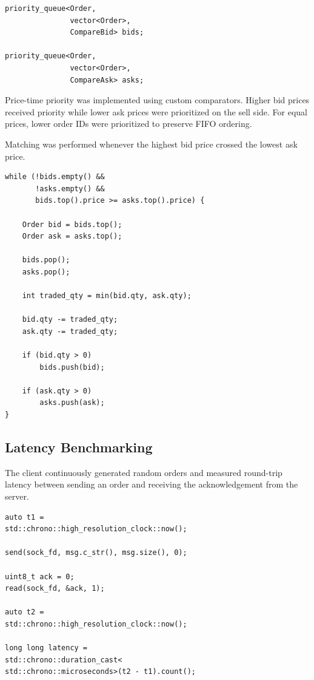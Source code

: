 \documentclass{article}
\begin{document}
\begin{lstlisting}[caption={Order Book Data Structures}]
priority_queue<Order,
               vector<Order>,
               CompareBid> bids;

priority_queue<Order,
               vector<Order>,
               CompareAsk> asks;
\end{lstlisting}

Price-time priority was implemented using custom comparators. Higher bid prices received priority while lower ask prices were prioritized on the sell side. For equal prices, lower order IDs were prioritized to preserve FIFO ordering.

Matching was performed whenever the highest bid price crossed the lowest ask price.

\begin{lstlisting}[caption={Matching Logic}]
while (!bids.empty() &&
       !asks.empty() &&
       bids.top().price >= asks.top().price) {

    Order bid = bids.top();
    Order ask = asks.top();

    bids.pop();
    asks.pop();

    int traded_qty = min(bid.qty, ask.qty);

    bid.qty -= traded_qty;
    ask.qty -= traded_qty;

    if (bid.qty > 0)
        bids.push(bid);

    if (ask.qty > 0)
        asks.push(ask);
}
\end{lstlisting}

\subsection{Latency Benchmarking}

The client continuously generated random orders and measured round-trip latency between sending an order and receiving the acknowledgement from the server.

\begin{lstlisting}[caption={Latency Measurement}]
auto t1 =
std::chrono::high_resolution_clock::now();

send(sock_fd, msg.c_str(), msg.size(), 0);

uint8_t ack = 0;
read(sock_fd, &ack, 1);

auto t2 =
std::chrono::high_resolution_clock::now();

long long latency =
std::chrono::duration_cast<
std::chrono::microseconds>(t2 - t1).count();
\end{lstlisting}
\end{document}
